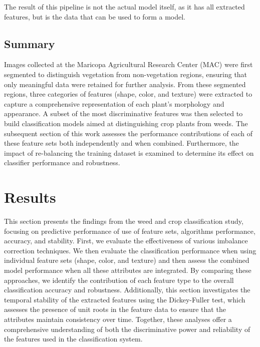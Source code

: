 \documentclass[letterpaper, notitlepage]{report}
\begin{document}
The result of this pipeline is not the actual model itself, as it has all extracted features, but is the data that can be used to form a model. 

\section{Summary}
Images collected at the Maricopa Agricultural Research Center (MAC) were first segmented to distinguish vegetation from non-vegetation regions, ensuring that only meaningful data were retained for further analysis. From these segmented regions, three categories of features (shape, color, and texture) were extracted to capture a comprehensive representation of each plant’s morphology and appearance. A subset of the most discriminative features was then selected to build classification models aimed at distinguishing crop plants from weeds. The subsequent section of this work assesses the performance contributions of each of these feature sets both independently and when combined. Furthermore, the impact of re-balancing the training dataset is examined to determine its effect on classifier performance and robustness.

%
%

\chapter{Results}
\label{section:results}
This section presents the findings from the weed and crop classification study, focusing on predictive performance of use of feature sets, algorithms performance, accuracy, and stability. First, we evaluate the effectiveness of various imbalance correction techniques.  We then evaluate the classification performance when using individual feature sets (shape, color, and texture) and then assess the combined model performance when all these attributes are integrated. By comparing these approaches, we identify the contribution of each feature type to the overall classification accuracy and robustness. Additionally, this section investigates the temporal stability of the extracted features using the Dickey-Fuller test, which assesses the presence of unit roots in the feature data to ensure that the attributes maintain consistency over time. Together, these analyses offer a comprehensive understanding of both the discriminative power and reliability of the features used in the classification system.
\end{document}
